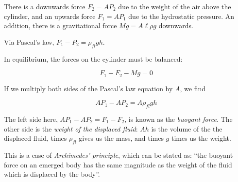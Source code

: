 \begin{figure}[H]
\centering
{}
\end{figure}



There is a downwards force $F_2 = A P_2$ due to the weight of the air above the cylinder, and an upwards force $F_1 = A P_1$ due to the hydrostatic pressure. An addition, there is a gravitational force $M g = A \ell \rho g$ downwards.

Via Pascal's law, $P_1 - P_2 = \rho_{fl} g h$.

In equilibrium, the forces on the cylinder must be balanced:

\begin{equation}
F_1 - F_2 - M g = 0
\end{equation}

If we multiply both sides of the Pascal's law equation by $A$, we find

\begin{equation}
A P_1 - A P_2 = A \rho_{fl} g h
\end{equation}

The left side here, $A P_1 - A P_2 = F_1 - F_2$, is known as the \emph{buoyant force}. The other side is the \emph{weight of the displaced fluid}: $A h$ is the volume of the the displaced fluid, times $\rho_{fl}$ gives us the mass, and times $g$ times us the weight.

This is a case of \emph{Archimedes' principle}, which can be stated as: ``the buoyant force on an emerged body has the same magnitude as the weight of the fluid which is displaced by the body''.

